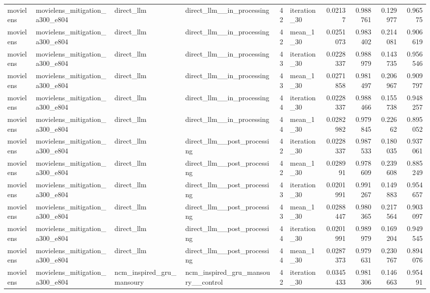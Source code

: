 \begin{table}[htbp!]
\begin{tabular}{llllrlrrrr}
movielens & movielens\_mitigation\_a300\_e804 & direct\_llm & direct\_llm\_\_in\_processing & 42 & iteration\_30 & 0.02137 & 0.988761 & 0.129977 & 0.96575 \\
movielens & movielens\_mitigation\_a300\_e804 & direct\_llm & direct\_llm\_\_in\_processing & 42 & mean\_1\_30 & 0.0251073 & 0.983402 & 0.214081 & 0.906619 \\
movielens & movielens\_mitigation\_a300\_e804 & direct\_llm & direct\_llm\_\_in\_processing & 43 & iteration\_30 & 0.0228337 & 0.988979 & 0.143735 & 0.956546 \\
movielens & movielens\_mitigation\_a300\_e804 & direct\_llm & direct\_llm\_\_in\_processing & 43 & mean\_1\_30 & 0.0271858 & 0.981497 & 0.206967 & 0.909797 \\
movielens & movielens\_mitigation\_a300\_e804 & direct\_llm & direct\_llm\_\_in\_processing & 44 & iteration\_30 & 0.0228337 & 0.988466 & 0.155738 & 0.948257 \\
movielens & movielens\_mitigation\_a300\_e804 & direct\_llm & direct\_llm\_\_in\_processing & 44 & mean\_1\_30 & 0.0282982 & 0.979845 & 0.22662 & 0.895052 \\
movielens & movielens\_mitigation\_a300\_e804 & direct\_llm & direct\_llm\_\_post\_processing & 42 & iteration\_30 & 0.0228337 & 0.987533 & 0.180035 & 0.937061 \\
movielens & movielens\_mitigation\_a300\_e804 & direct\_llm & direct\_llm\_\_post\_processing & 42 & mean\_1\_30 & 0.028991 & 0.978609 & 0.239608 & 0.885249 \\
movielens & movielens\_mitigation\_a300\_e804 & direct\_llm & direct\_llm\_\_post\_processing & 43 & iteration\_30 & 0.0201991 & 0.991267 & 0.149883 & 0.954657 \\
movielens & movielens\_mitigation\_a300\_e804 & direct\_llm & direct\_llm\_\_post\_processing & 43 & mean\_1\_30 & 0.0288447 & 0.980365 & 0.217564 & 0.903097 \\
movielens & movielens\_mitigation\_a300\_e804 & direct\_llm & direct\_llm\_\_post\_processing & 44 & iteration\_30 & 0.0201991 & 0.989979 & 0.169204 & 0.949545 \\
movielens & movielens\_mitigation\_a300\_e804 & direct\_llm & direct\_llm\_\_post\_processing & 44 & mean\_1\_30 & 0.0287373 & 0.979631 & 0.230767 & 0.894076 \\
movielens & movielens\_mitigation\_a300\_e804 & ncm\_inspired\_gru\_mansoury & ncm\_inspired\_gru\_mansoury\_\_control & 42 & iteration\_30 & 0.0345433 & 0.981306 & 0.146663 & 0.95491 \\

\end{tabular}
\end{table}
